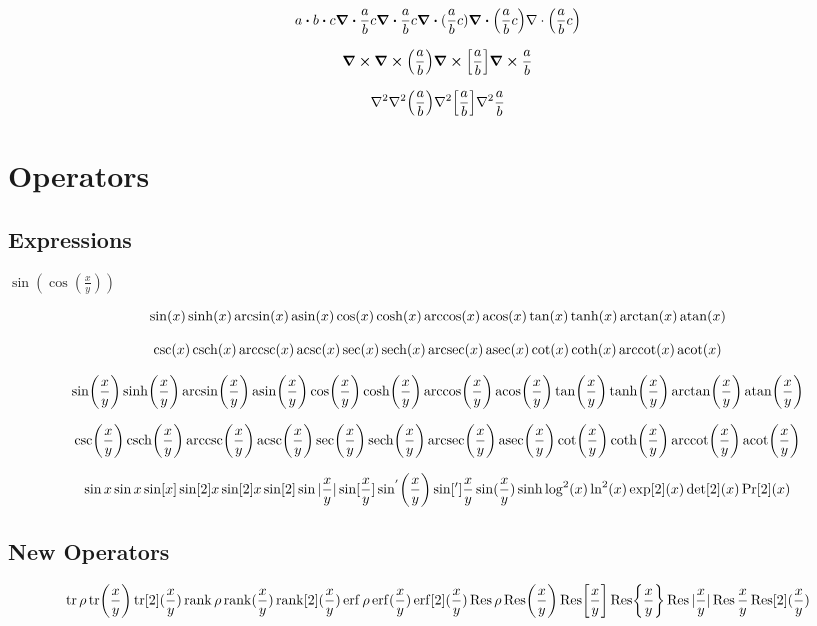 \documentclass{article}
\begin{document}
\[
  a\dotproduct b \vdot c
  \divergence{\frac{a}{b}c}
  \div{\frac{a}{b}c}
  \div{(\frac{a}{b}c)}
  \div(\frac{a}{b}c)
  {\bf\nabla} \cdot \left(\frac{a}{b}c\right)
\]

\[
  \curl 
  \curl(\frac{a}{b})
  \curl[\frac{a}{b}]
  \curl{\frac{a}{b}}
\]

\[
  \laplacian 
  \laplacian(\frac{a}{b})
  \laplacian[\frac{a}{b}]
  \laplacian{\frac{a}{b}}
\]

\newpage

\section*{Operators}

\subsection*{Expressions}


$\sin(\cos(\frac{x}{y}))$

\[
  \sin(x)
  \sinh(x)
  \arcsin(x)
  \asin(x)
  \cos(x)
  \cosh(x)
  \arccos(x)
  \acos(x)
  \tan(x)
  \tanh(x)
  \arctan(x)
  \atan(x)
\]

\[
  \csc(x)
  \csch(x)
  \arccsc(x)
  \acsc(x)
  \sec(x)
  \sech(x)
  \arcsec(x)
  \asec(x)
  \cot(x)
  \coth(x)
  \arccot(x)
  \acot(x)
\]

\[
  \sin(\frac{x}{y})
  \sinh(\frac{x}{y})
  \arcsin(\frac{x}{y})
  \asin(\frac{x}{y})
  \cos(\frac{x}{y})
  \cosh(\frac{x}{y})
  \arccos(\frac{x}{y})
  \acos(\frac{x}{y})
  \tan(\frac{x}{y})
  \tanh(\frac{x}{y})
  \arctan(\frac{x}{y})
  \atan(\frac{x}{y})
\]

\[
  \csc(\frac{x}{y})
  \csch(\frac{x}{y})
  \arccsc(\frac{x}{y})
  \acsc(\frac{x}{y})
  \sec(\frac{x}{y})
  \sech(\frac{x}{y})
  \arcsec(\frac{x}{y})
  \asec(\frac{x}{y})
  \cot(\frac{x}{y})
  \coth(\frac{x}{y})
  \arccot(\frac{x}{y})
  \acot(\frac{x}{y})
\]


\[
  \sin x
  \sin{x}
  \sin[x]
  \sin[2]{x}
  \sin[2]x
  \sin[2]
  \sin|\frac{x}{y}|
  \sin[\frac{x}{y}]
  \sin['](\frac{x}{y})
  \sin[']{\frac{x}{y}}
  \sine(\frac{x}{y})
  \hypsine
  \log[2](x)
  \ln[2](x)
  \exp[2](x)
  \det[2](x)
  \Pr[2](x)
\]

\newpage
\subsection*{New Operators}

\[
  \tr\rho
  \tr(\frac{x}{y})
  \tr[2](\frac{x}{y})
  \rank\rho
  \rank(\frac{x}{y})
  \rank[2](\frac{x}{y})
  \erf\rho
  \erf(\frac{x}{y})
  \erf[2](\frac{x}{y})
  \Res\rho
  \Res(\frac{x}{y})
  \Res[\frac{x}{y}]
  \Res{\frac{x}{y}}
  \Res|\frac{x}{y}|
  \Res \frac{x}{y}
  \Res[2](\frac{x}{y})
\]
\end{document}
